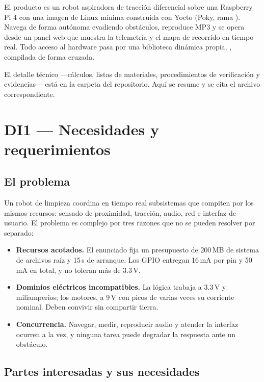 \documentclass[11pt,a4paper]{article}
\newcommand{\id}[1]{\texttt{\detokenize{#1}}}
\begin{document}
El producto es un robot aspiradora de tracción diferencial sobre una
Raspberry Pi 4 con una imagen de Linux mínima construida con Yocto (Poky,
rama \id{scarthgap}). Navega de forma autónoma evadiendo obstáculos, reproduce
MP3 y se opera desde un panel web que muestra la telemetría y el mapa de
recorrido en tiempo real. Todo acceso al hardware pasa por una biblioteca
dinámica propia, \id{librobot.so}, compilada de forma cruzada.

El detalle técnico ---cálculos, listas de materiales, procedimientos de
verificación y evidencias--- está en la carpeta \id{docs/} del repositorio.
Aquí se resume y se cita el archivo correspondiente.

\section{DI1 --- Necesidades y requerimientos}

\subsection{El problema}

Un robot de limpieza coordina en tiempo real subsistemas que compiten por los
mismos recursos: sensado de proximidad, tracción, audio, red e interfaz de
usuario. El problema es complejo por tres razones que no se pueden resolver
por separado:

\begin{itemize}
  \item \textbf{Recursos acotados.} El enunciado fija un presupuesto de
        200\,MB de sistema de archivos raíz y 15\,s de arranque. Los GPIO
        entregan 16\,mA por pin y 50\,mA en total, y no toleran más de
        3.3\,V.
  \item \textbf{Dominios eléctricos incompatibles.} La lógica trabaja a
        3.3\,V y miliamperios; los motores, a 9\,V con picos de varias
        veces su corriente nominal. Deben convivir sin compartir tierra.
  \item \textbf{Concurrencia.} Navegar, medir, reproducir audio y atender la
        interfaz ocurren a la vez, y ninguna tarea puede degradar la
        respuesta ante un obstáculo.
\end{itemize}

\subsection{Partes interesadas y sus necesidades}
\end{document}
